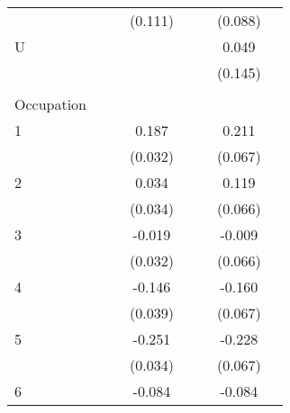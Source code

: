 \begin{longtable}{l*{3}{c}|l*{3}{c}}
	&                     &                     &     (0.111)         &                     &                     &     (0.088)         \\
		U                   &                     &                     &                     &                     &                     &       0.049         \\
	&                     &                     &                     &                     &                     &     (0.145)         \\
		&&&&&&&\\
	Occupation &&&&&&\\
	1                   &                     &                     &       0.187\sym{***}&                     &                     &       0.211\sym{***}\\
	&                     &                     &     (0.032)         &                     &                     &     (0.067)         \\
	2                   &                     &                     &       0.034         &                     &                     &       0.119\sym{*}  \\
	&                     &                     &     (0.034)         &                     &                     &     (0.066)         \\
	3                   &                     &                     &      -0.019         &                     &                     &      -0.009         \\
	&                     &                     &     (0.032)         &                     &                     &     (0.066)         \\
	4                   &                     &                     &      -0.146\sym{***}&                     &                     &      -0.160\sym{**} \\
	&                     &                     &     (0.039)         &                     &                     &     (0.067)         \\
	5                   &                     &                     &      -0.251\sym{***}&                     &                     &      -0.228\sym{***}\\
	&                     &                     &     (0.034)         &                     &                     &     (0.067)         \\
	6                   &                     &                     &      -0.084\sym{*}  &                     &                     &      -0.084         \\

\end{longtable}
